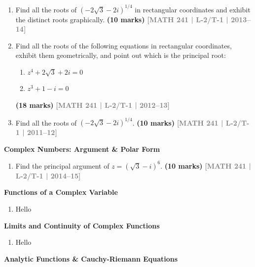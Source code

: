 \documentclass[12pt,a4paper]{article}
\newcommand{\yr}[1]{\hfill\textcolor{gray}{\small\textbf{[#1]}}}
\newcommand{\mk}[1]{\textcolor{orange!70!black}{\small\textbf{(#1 marks)}}}
\newcommand{\subtopic}[2]{%
  \vspace{10pt}
  \noindent\begin{tcolorbox}[colback=#1!8,colframe=#1,boxrule=0.6pt,arc=4pt,
    left=6pt,right=6pt,top=4pt,bottom=4pt]
    \small\bfseries\textcolor{#1}{#2}
  \end{tcolorbox}
  \vspace{2pt}
}
\begin{document}
\begin{enumerate}\item Find all the roots of $(-2\sqrt{3}-2i)^{1/4}$ in rectangular coordinates and exhibit the distinct roots graphically.
\mk{10} \yr{MATH 241 | L-2/T-1 | 2013--14}

\item Find all the roots of the following equations in rectangular coordinates, exhibit them geometrically, and point out which is the principal root:
\begin{enumerate}
  \item $z^{4}+2\sqrt{3}+2i=0$
  \item $z^{3}+1-i=0$
\end{enumerate}
\mk{18} \yr{MATH 241 | L-2/T-1 | 2012--13}

\item Find all the roots of $(-2\sqrt{3}-2i)^{1/4}$.
\mk{10} \yr{MATH 241 | L-2/T-1 | 2011--12}

\end{enumerate}

\subtopic{cE}{Complex Numbers: Argument \& Polar Form}
\label{sub:s5-complexnums}

\begin{enumerate}\item Find the principal argument of $z=(\sqrt{3}-i)^{6}$.
\mk{10} \yr{MATH 241 | L-2/T-1 | 2014--15}

\end{enumerate}

\subtopic{cE}{Functions of a Complex Variable}
\label{sub:s5-functions}

\begin{enumerate}\item Hello \end{enumerate}

\subtopic{cE}{Limits and Continuity of Complex Functions}
\label{sub:s5-limcont}

\begin{enumerate}\item Hello \end{enumerate}

\subtopic{cE}{Analytic Functions \& Cauchy-Riemann Equations}
\label{sub:s5-analytic}
\end{document}

